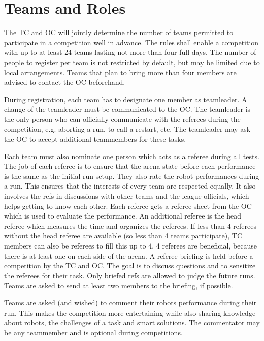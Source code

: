 \label{sec:Competition}

\section{Teams and Roles}

The TC and OC will jointly determine the number of teams permitted to participate in a competition well in advance. The rules shall enable a competition with up to at least 24 teams lasting not more than four full days. The number of people to register per team is not restricted by default, but may be limited due to local arrangements. Teams that plan to bring more than four members are advised to contact the OC beforehand.

During registration, each team has to designate one member as teamleader. A change of the teamleader must be communicated to the OC. 
The teamleader is the only person who can officially communicate with the referees during the competition, e.g. aborting a run, to call a restart, etc. 
The teamleader may ask the OC to accept additional teammembers for these tasks.

Each team must also nominate one person which acts as a referee during all tests.
The job of each referee is to ensure that the arena state before each performance is the same as the initial run setup.
They also rate the robot performances during a run. 
This ensures that the interests of every team are respected equally.
It also involves the refs in discussions with other teams and the league officials,
which helps getting to know each other.
Each referee gets a referee sheet from the OC which is used to evaluate the performance. An additional referee is the head referee which measures the time and organizes the referees. If less than 4 referees without the head referee are available (so less than 4 teams participate), TC members can also be referees to fill this up to 4. 4 referees are beneficial, because there is at least one on each side of the arena. A referee briefing is held before a competition by the TC and OC. The goal is to discuss questions and to sensitize the referees for their task. Only briefed refs are allowed to judge the future runs. Teams are asked to send at least two members to the briefing, if possible.

Teams are asked (and wished) to comment their robots performance during their run.
This makes the competition more entertaining while also sharing knowledge about robots, 
the challenges of a task and smart solutions.
The commentator may be any teammember and is optional during competitions.

